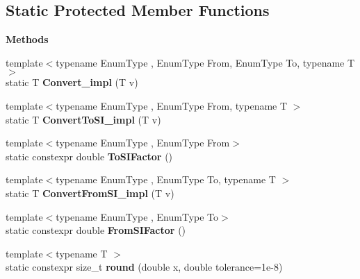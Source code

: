 \subsection*{Static Protected Member Functions}
\begin{Indent}\textbf{ Methods}\par
\begin{DoxyCompactItemize}
\item 
\mbox{\label{classrev_1_1_units_a1ddfa4d1892c42aac0ade0170ad0bd2a}} 
{\footnotesize template$<$typename Enum\+Type , Enum\+Type From, Enum\+Type To, typename T $>$ }\\static T {\bfseries Convert\+\_\+impl} (T v)
\item 
\mbox{\label{classrev_1_1_units_a56caedd024f859d0f882eb60975c479a}} 
{\footnotesize template$<$typename Enum\+Type , Enum\+Type From, typename T $>$ }\\static T {\bfseries Convert\+To\+S\+I\+\_\+impl} (T v)
\item 
\mbox{\label{classrev_1_1_units_ac5ca7785602b9b27b5bdd12f176a6660}} 
{\footnotesize template$<$typename Enum\+Type , Enum\+Type From$>$ }\\static constexpr double {\bfseries To\+S\+I\+Factor} ()
\item 
\mbox{\label{classrev_1_1_units_a065eda31613b31fd1b5117ac65bea970}} 
{\footnotesize template$<$typename Enum\+Type , Enum\+Type To, typename T $>$ }\\static T {\bfseries Convert\+From\+S\+I\+\_\+impl} (T v)
\item 
\mbox{\label{classrev_1_1_units_ab2da11ec496013489c972f15be10c19b}} 
{\footnotesize template$<$typename Enum\+Type , Enum\+Type To$>$ }\\static constexpr double {\bfseries From\+S\+I\+Factor} ()
\item 
\mbox{\label{classrev_1_1_units_a1234e0bcca56d2db3ddf425083514fe5}} 
{\footnotesize template$<$typename T $>$ }\\static constexpr size\+\_\+t {\bfseries round} (double x, double tolerance=1e-\/8)
\end{DoxyCompactItemize}
\end{Indent}
